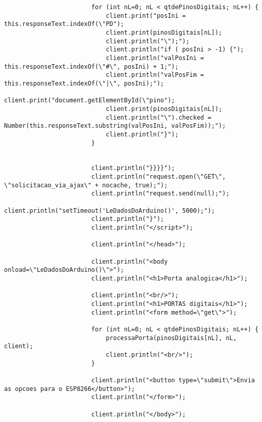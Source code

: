\begin{lstlisting}
                        for (int nL=0; nL < qtdePinosDigitais; nL++) {                                                 
                            client.print("posIni = this.responseText.indexOf(\"PD");
                            client.print(pinosDigitais[nL]);
                            client.println("\");");
                            client.println("if ( posIni > -1) {");
                            client.println("valPosIni = this.responseText.indexOf(\"#\", posIni) + 1;");
                            client.println("valPosFim = this.responseText.indexOf(\"|\", posIni);");
                            client.print("document.getElementById(\"pino");
                            client.print(pinosDigitais[nL]);
                            client.println("\").checked = Number(this.responseText.substring(valPosIni, valPosFim));");
                            client.println("}");
                        }


                        client.println("}}}}");
                        client.println("request.open(\"GET\", \"solicitacao_via_ajax\" + nocache, true);");
                        client.println("request.send(null);");
                        client.println("setTimeout('LeDadosDoArduino()', 5000);");
                        client.println("}");
                        client.println("</script>");
                        
                        client.println("</head>");

                        client.println("<body onload=\"LeDadosDoArduino()\">");                                     
                        client.println("<h1>Porta analogica</h1>");

                        client.println("<br/>");                        
                        client.println("<h1>PORTAS digitais</h1>");
                        client.println("<form method=\"get\">");

                        for (int nL=0; nL < qtdePinosDigitais; nL++) {
                            processaPorta(pinosDigitais[nL], nL, client);
                            client.println("<br/>");
                        }
                        
                        client.println("<button type=\"submit\">Envia as opcoes para o ESP8266</button>");
                        client.println("</form>");                      
                        
                        client.println("</body>");
                        

\end{lstlisting}
